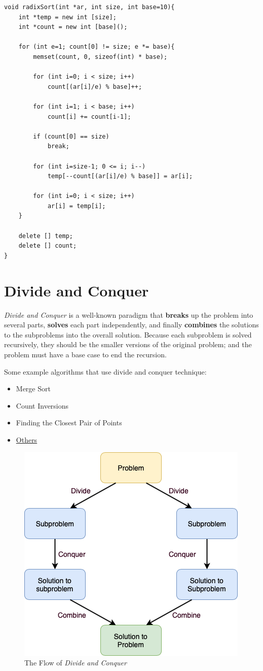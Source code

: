 \documentclass[12pt]{article}
\begin{document}
\begin{verbatim}
void radixSort(int *ar, int size, int base=10){
    int *temp = new int [size];
    int *count = new int [base]();
	
    for (int e=1; count[0] != size; e *= base){
        memset(count, 0, sizeof(int) * base);
		
        for (int i=0; i < size; i++)
            count[(ar[i]/e) % base]++;
		
        for (int i=1; i < base; i++)
            count[i] += count[i-1];
		
        if (count[0] == size)
            break;
		
        for (int i=size-1; 0 <= i; i--)
            temp[--count[(ar[i]/e) % base]] = ar[i];
		
        for (int i=0; i < size; i++)
            ar[i] = temp[i];
    }
	
    delete [] temp;
    delete [] count;
}
\end{verbatim}

\cleardoublepage

	\section{Divide and Conquer}

\textit{Divide and Conquer} is a well-known paradigm that \textbf{breaks} up the problem into several parts, \textbf{solves} each part independently, and finally \textbf{combines} the solutions to the subproblems into the overall solution. Because each subproblem is solved recursively, they should be the smaller versions of the original problem; and the problem must have a base case to end the recursion. 

Some example algorithms that use divide and conquer technique: 
\begin{itemize}
	\item Merge Sort
	\item Count Inversions
	\item Finding the Closest Pair of Points 
	\item \href{https://www.geeksforgeeks.org/divide-and-conquer/}{Others}
\end{itemize}	

\begin{figure}[h]
	\centering
	\includegraphics[width=0.55\linewidth]{divide_and_conquer}
	\caption{The Flow of \textit{Divide and Conquer}}
	\label{fig:divide_and_conquer}
\end{figure}
\end{document}
